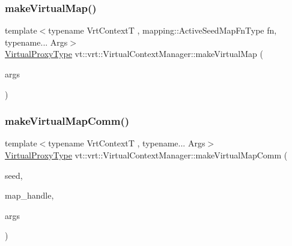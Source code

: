 \subsubsection{\texorpdfstring{make\+Virtual\+Map()}{makeVirtualMap()}\hspace{0.1cm}{\footnotesize\ttfamily [2/2]}}
{\footnotesize\ttfamily template$<$typename Vrt\+ContextT , mapping\+::\+Active\+Seed\+Map\+Fn\+Type fn, typename... Args$>$ \\
\hyperlink{namespacevt_a1b417dd5d684f045bb58a0ede70045ac}{Virtual\+Proxy\+Type} vt\+::vrt\+::\+Virtual\+Context\+Manager\+::make\+Virtual\+Map (\begin{DoxyParamCaption}\item[{Args...}]{args }\end{DoxyParamCaption})}

\mbox{\label{structvt_1_1vrt_1_1_virtual_context_manager_ac0707436352437160375252ec9953675}} 
\subsubsection{\texorpdfstring{make\+Virtual\+Map\+Comm()}{makeVirtualMapComm()}}
{\footnotesize\ttfamily template$<$typename Vrt\+ContextT , typename... Args$>$ \\
\hyperlink{namespacevt_a1b417dd5d684f045bb58a0ede70045ac}{Virtual\+Proxy\+Type} vt\+::vrt\+::\+Virtual\+Context\+Manager\+::make\+Virtual\+Map\+Comm (\begin{DoxyParamCaption}\item[{\hyperlink{namespacevt_ae2e13198bdef4d5b8e603d6c1c7f0969}{Seed\+Type} const \&}]{seed,  }\item[{\hyperlink{namespacevt_af64846b57dfcaf104da3ef6967917573}{Handler\+Type} const \&}]{map\+\_\+handle,  }\item[{Args \&\&...}]{args }\end{DoxyParamCaption})\hspace{0.3cm}{\ttfamily [private]}}

\mbox{\label{structvt_1_1vrt_1_1_virtual_context_manager_a18c6dad4c4c963f883c59f64f78e36cb}} 
